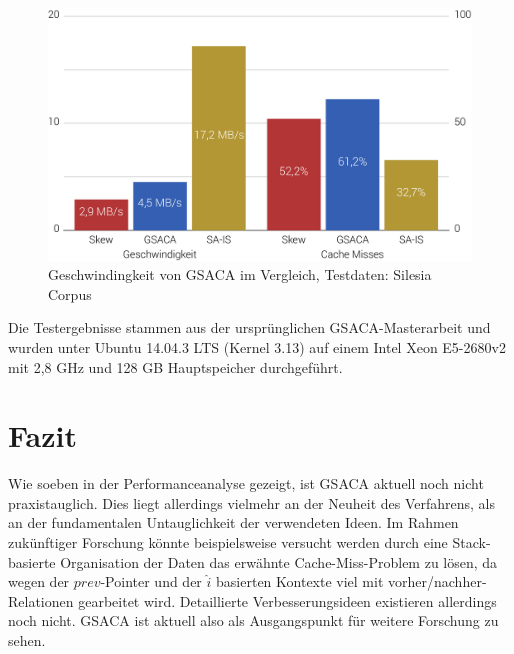 \documentclass[twoside,11pt]{article}
\theoremstyle{break}
\begin{document}
\begin{figure}[h]
	\centering
	\includegraphics[width=0.6\linewidth,bb=0 0 830 495]{./assets/performance.pdf}
	\caption{Geschwindingkeit von GSACA im Vergleich, Testdaten: Silesia Corpus}
\label{fig:performance}
\end{figure}

Die Testergebnisse stammen aus der ursprünglichen GSACA-Masterarbeit und wurden unter Ubuntu 14.04.3 LTS (Kernel 3.13) auf einem Intel Xeon E5-2680v2 mit 2,8 GHz und 128 GB Hauptspeicher durchgeführt.

\section{Fazit}

Wie soeben in der Performanceanalyse gezeigt, ist GSACA aktuell noch nicht praxistauglich. Dies liegt allerdings vielmehr an der Neuheit des Verfahrens, als an der fundamentalen Untauglichkeit der verwendeten Ideen. Im Rahmen zukünftiger Forschung könnte beispielsweise versucht werden durch eine Stack-basierte Organisation der Daten das erwähnte Cache-Miss-Problem zu lösen, da wegen der $prev$-Pointer und der $\widehat{i}$ basierten Kontexte viel mit vorher/nachher-Relationen gearbeitet wird. Detaillierte Verbesserungsideen existieren allerdings noch nicht. GSACA ist aktuell also als Ausgangspunkt für weitere Forschung zu sehen.



\end{document}
